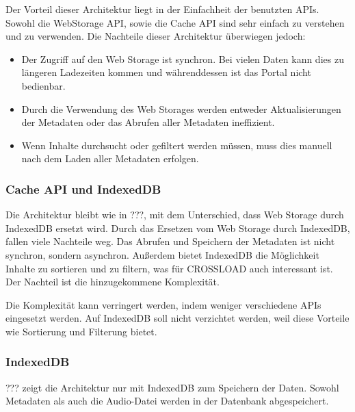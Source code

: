 
Der Vorteil dieser Architektur liegt in der Einfachheit der benutzten \acp{API}. Sowohl die WebStorage \ac{API}, sowie die Cache \ac{API} sind sehr einfach zu verstehen und zu verwenden. Die Nachteile dieser Architektur überwiegen jedoch:

\begin{itemize}
\item Der Zugriff auf den Web Storage ist synchron. Bei vielen Daten kann dies zu längeren Ladezeiten kommen und währenddessen ist das Portal nicht bedienbar. 
\item Durch die Verwendung des Web Storages werden entweder Aktualisierungen der Metadaten oder das Abrufen aller Metadaten ineffizient. 
\item Wenn Inhalte durchsucht oder gefiltert werden müssen, muss dies manuell nach dem Laden aller Metadaten erfolgen.
\end{itemize}

\subsubsection{Cache API und IndexedDB}
Die Architektur bleibt wie in ???, mit dem Unterschied, dass Web Storage durch IndexedDB ersetzt wird. Durch das Ersetzen vom Web Storage durch IndexedDB, fallen viele Nachteile weg. Das Abrufen und Speichern der Metadaten ist nicht synchron, sondern asynchron. Außerdem bietet IndexedDB die Möglichkeit Inhalte zu sortieren und zu filtern, was für CROSSLOAD auch interessant ist. Der Nachteil ist die hinzugekommene Komplexität. 

Die Komplexität kann verringert werden, indem weniger verschiedene \acp{API} eingesetzt werden. Auf IndexedDB soll nicht verzichtet werden, weil diese Vorteile wie Sortierung und Filterung bietet. 

\subsubsection{IndexedDB}
??? zeigt die Architektur nur mit IndexedDB zum Speichern der Daten. Sowohl Metadaten als auch die Audio-Datei werden in der Datenbank abgespeichert. 



